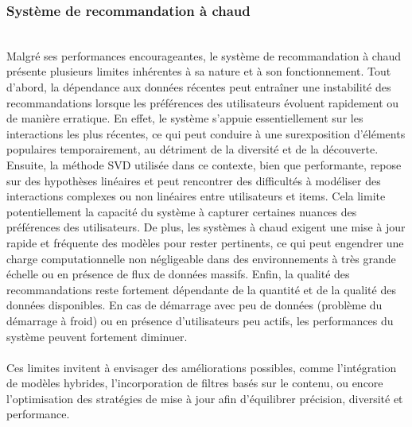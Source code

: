 \documentclass{article}
\begin{document}
\subsubsection{Système de recommandation à chaud}
$ $\\
Malgré ses performances encourageantes, le système de recommandation à chaud présente plusieurs limites inhérentes à sa nature et à son fonctionnement.
Tout d’abord, la dépendance aux données récentes peut entraîner une instabilité des recommandations lorsque les préférences des utilisateurs évoluent rapidement ou de manière erratique. En effet, le système s’appuie essentiellement sur les interactions les plus récentes, ce qui peut conduire à une surexposition d’éléments populaires temporairement, au détriment de la diversité et de la découverte.
Ensuite, la méthode SVD utilisée dans ce contexte, bien que performante, repose sur des hypothèses linéaires et peut rencontrer des difficultés à modéliser des interactions complexes ou non linéaires entre utilisateurs et items. Cela limite potentiellement la capacité du système à capturer certaines nuances des préférences des utilisateurs.
De plus, les systèmes à chaud exigent une mise à jour rapide et fréquente des modèles pour rester pertinents, ce qui peut engendrer une charge computationnelle non négligeable dans des environnements à très grande échelle ou en présence de flux de données massifs.
Enfin, la qualité des recommandations reste fortement dépendante de la quantité et de la qualité des données disponibles. En cas de démarrage avec peu de données (problème du démarrage à froid) ou en présence d’utilisateurs peu actifs, les performances du système peuvent fortement diminuer.\\
\\
Ces limites invitent à envisager des améliorations possibles, comme l’intégration de modèles hybrides, l’incorporation de filtres basés sur le contenu, ou encore l’optimisation des stratégies de mise à jour afin d’équilibrer précision, diversité et performance.
\end{document}
